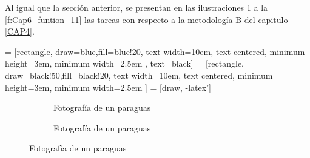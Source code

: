        Al igual que la sección anterior, se presentan en las ilustraciones \ref{f:Cap6_funtion_7} a la \ref{f:Cap6_funtion_11} las tareas con respecto a la  metodología B del capitulo \ref{CAP4}. 
    
            \hspace{1cm}


     = [rectangle, draw=blue,fill=blue!20, text width=10em, text centered, minimum height=3em, minimum width=2.5em , text=black]
     = [rectangle, draw=black!50,fill=black!20, text width=10em, text centered, minimum height=3em, minimum width=2.5em ]
     = [draw, -latex']

    \begin{figure}[h]
        \centering
        \begin{subfigure}
                \centering
                    \caption{Fotografía de un paraguas}
                    \label{f:Cap6_funtion_7}
        \end{subfigure}
        
        \hspace{1cm}

        \begin{subfigure}
                \centering
                    \caption{Fotografía de un paraguas}
                    \label{f:Cap6_funtion_8}
        \end{subfigure}
        

\end{figure}
